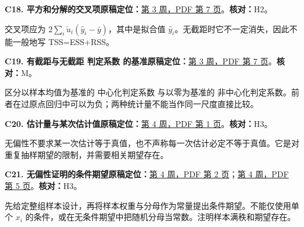 \par\medskip\noindent\begin{minipage}{\linewidth}

\label{err:rto-cross-term}

\textbf{C18. 平方和分解的交叉项}\quad\textbf{原稿定位：}\hyperref[src:w3p7]{第 3 周，PDF 第 7 页}。\quad\textbf{核对：}H2。\par

交叉项应为 $2\sum_i\check u_i(\hat y_i-\bar y)$，其中是拟合值 $\hat y_i$。无截距时它不一定消失，因此不能一般地写 TSS=ESS+RSS。

\end{minipage}\par

\par\medskip\noindent\begin{minipage}{\linewidth}

\label{err:rto-r2}

\textbf{C19. 有截距与无截距 判定系数 的基准}\quad\textbf{原稿定位：}\hyperref[src:w3p7]{第 3 周，PDF 第 7 页}。\quad\textbf{核对：}M。\par

区分以样本均值为基准的 中心化判定系数 与以零为基准的 非中心化判定系数。前者在过原点回归中可以为负；两种统计量不能当作同一尺度直接比较。

\end{minipage}\par

\par\medskip\noindent\begin{minipage}{\linewidth}

\label{err:estimator-estimate}

\textbf{C20. 估计量与某次估计值}\quad\textbf{原稿定位：}\hyperref[src:w4p1]{第 4 周，PDF 第 1 页}。\quad\textbf{核对：}H3。\par

无偏性不要求某一次估计等于真值，也不声称每一次估计必定不等于真值。它是对重复抽样期望的限制，并需要相关期望存在。

\end{minipage}\par

\par\medskip\noindent\begin{minipage}{\linewidth}

\label{err:conditioning}

\textbf{C21. 无偏性证明的条件期望}\quad\textbf{原稿定位：}\hyperref[src:w4p2]{第 4 周，PDF 第 2 页}；\hyperref[src:w4p5]{第 4 周，PDF 第 5 页}。\quad\textbf{核对：}H3。\par

先给定整组样本设计，再将样本权重与分母作为常量提出条件期望。不能仅使用单个 $x_i$ 的条件，或在无条件期望中把随机分母当常数。注明样本满秩和期望存在。

\end{minipage}\par

